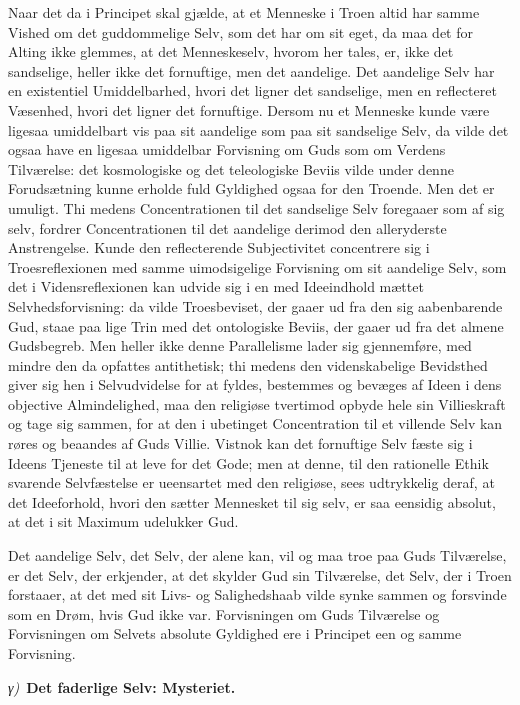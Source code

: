 \documentclass[12pt]{book}
\newcommand{\greekrun}[2]{%
  \medskip\begin{center}{\itshape #1)}\ {\bfseries #2}\end{center}\medskip}
\begin{document}
Naar det da i Principet skal gjælde, at et Menneske i Troen altid
har samme Vished om det guddommelige Selv, som det har om sit eget,
da maa det for Alting ikke glemmes, at det Menneskeselv, hvorom her
tales, er, ikke det sandselige, heller ikke det fornuftige, men det
aandelige. Det aandelige Selv har en existentiel Umiddelbarhed,
hvori det ligner det sandselige, men en reflecteret Væsenhed, hvori
det ligner det fornuftige. Dersom nu et Menneske kunde være ligesaa
umiddelbart vis paa sit aandelige som paa sit sandselige Selv, da
vilde det ogsaa have en ligesaa umiddelbar Forvisning om Guds som om
Verdens Tilværelse: det kosmologiske og det teleologiske Beviis
vilde under denne Forudsætning kunne erholde fuld Gyldighed ogsaa
for den Troende. Men det er umuligt. Thi medens Concentrationen til
det sandselige Selv foregaaer som af sig selv, fordrer
Concentrationen til det aandelige derimod den alleryderste
Anstrengelse. Kunde den reflecterende Subjectivitet concentrere sig
i Troesreflexionen med samme uimodsigelige Forvisning om sit
aandelige Selv, som det i Vidensreflexionen kan udvide sig i en med
Ideeindhold mættet Selvhedsforvisning: da vilde Troesbeviset, der
gaaer ud fra den sig aabenbarende Gud, staae paa lige Trin med det
ontologiske Beviis, der gaaer ud fra det almene Gudsbegreb. Men
heller ikke denne Parallelisme lader sig gjennemføre, med mindre den
da opfattes antithetisk;
thi medens den videnskabelige Bevidsthed giver sig hen i
Selvudvidelse for at fyldes, bestemmes og bevæges af Ideen i dens
objective Almindelighed, maa den religiøse tvertimod opbyde hele sin
Villieskraft og tage sig sammen, for at den i ubetinget
Concentration til et villende Selv kan røres og beaandes af Guds
Villie. Vistnok kan det fornuftige Selv fæste sig i Ideens Tjeneste
til at leve for det Gode; men at denne, til den rationelle Ethik
svarende Selvfæstelse er ueensartet med den religiøse, sees
udtrykkelig deraf, at det Ideeforhold, hvori den sætter Mennesket
til sig selv, er saa eensidig absolut, at det i sit Maximum
udelukker Gud.

Det aandelige Selv, det Selv, der alene kan, vil og maa troe paa
Guds Tilværelse, er det Selv, der erkjender, at det skylder Gud sin
Tilværelse, det Selv, der i Troen forstaaer, at det med sit Livs- og
Salighedshaab vilde synke sammen og forsvinde som en Drøm, hvis Gud
ikke var. Forvisningen om Guds Tilværelse og Forvisningen om Selvets
absolute Gyldighed ere i Principet een og samme Forvisning.

\greekrun{γ}{Det faderlige Selv: Mysteriet.}
\end{document}
